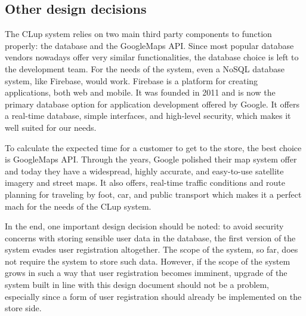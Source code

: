 \subsection{Other design decisions}
\hspace{\parindent}The CLup system relies on two main third party components to function properly: the database and the GoogleMaps API. Since most popular database vendors nowadays offer very similar functionalities, the database choice is left to the development team. For the needs of the system, even a NoSQL database system, like Firebase, would work. Firebase is a platform for creating applications, both web and mobile. It was founded in 2011 and is now the primary database option for application development offered by Google. It offers a real-time database, simple interfaces, and high-level security, which makes it well suited for our needs. \newline

To calculate the expected time for a customer to get to the store, the best choice is GoogleMaps API. Through the years, Google polished their map system offer and today they have a widespread, highly accurate, and easy-to-use satellite imagery and street maps. It also offers, real-time traffic conditions and route planning for traveling by foot, car, and public transport which makes it a perfect mach for the needs of the CLup system.\newline 

In the end, one important design decision should be noted: to avoid security concerns with storing sensible user data in the database, the first version of the system evades user registration altogether. The scope of the system, so far, does not require the system to store such data. However, if the scope of the system grows in such a way that user registration becomes imminent, upgrade of the system built in line with this design document should not be a problem, especially since a form of user registration should already be implemented on the store side. 
\newpage




